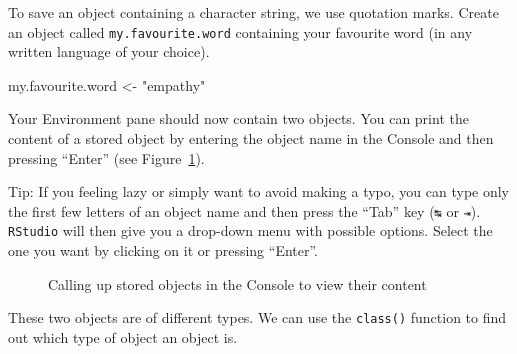 \documentclass[
  letterpaper,
  DIV=11,
  numbers=noendperiod,
  oneside]{scrreprt}
\newenvironment{Shaded}{\begin{snugshade}}{\end{snugshade}}
\newcommand{\NormalTok}[1]{\textcolor[rgb]{0.00,0.23,0.31}{#1}}
\newcommand{\OtherTok}[1]{\textcolor[rgb]{0.00,0.23,0.31}{#1}}
\newcommand{\StringTok}[1]{\textcolor[rgb]{0.13,0.47,0.30}{#1}}
\begin{document}
To save an object containing a character string, we use quotation marks.
Create an object called \texttt{my.favourite.word} containing your
favourite word (in any written language of your choice).

\begin{Shaded}
\begin{Highlighting}[]
\NormalTok{my.favourite.word }\OtherTok{\textless{}{-}} \StringTok{"empathy"}
\end{Highlighting}
\end{Shaded}

Your Environment pane should now contain two objects. You can print the
content of a stored object by entering the object name in the Console
and then pressing ``Enter'' (see Figure~\ref{fig-ShowObjects}).

Tip: If you feeling lazy or simply want to avoid making a typo, you can
type only the first few letters of an object name and then press the
``Tab'' key (\texttt{↹} or \texttt{⇥}). \texttt{RStudio} will then give
you a drop-down menu with possible options. Select the one you want by
clicking on it or pressing ``Enter''.

\begin{figure}


\caption{\label{fig-ShowObjects}Calling up stored objects in the Console
to view their content}

\end{figure}%

These two objects are of different types. We can use the
\texttt{class()} function to find out which type of object an object is.
\end{document}
